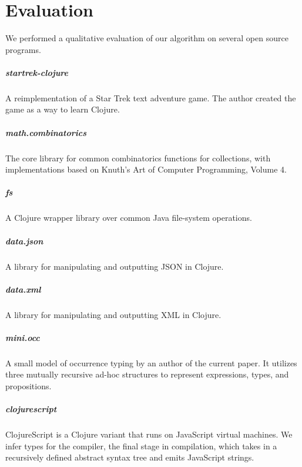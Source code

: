 \chapter{Evaluation}

We performed a qualitative evaluation of our algorithm
on several open source programs.

\paragraph{startrek-clojure}
A reimplementation of a Star Trek text adventure game.
The author created the game as a way to learn
Clojure.

\paragraph{math.combinatorics}
The core library for common combinatorics functions
for collections,
with implementations based on Knuth's Art of Computer
Programming, Volume 4.

\paragraph{fs}
A Clojure wrapper library over common Java file-system operations.

\paragraph{data.json}
A library for manipulating and outputting JSON in Clojure.

\paragraph{data.xml}
A library for manipulating and outputting XML in Clojure.

\paragraph{mini.occ}
A small model of occurrence typing by an author of the
current paper. It utilizes three mutually recursive
ad-hoc structures to represent expressions, types,
and propositions.

\paragraph{clojurescript}
ClojureScript is a Clojure variant that runs on JavaScript
virtual machines. We infer types for the compiler, the final
stage in compilation, which takes in a recursively
defined abstract syntax tree and emits JavaScript strings.


